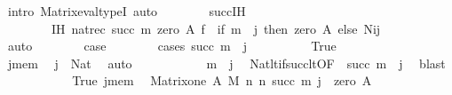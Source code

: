 \begin{isabellebody}
\ {\isacharparenleft}{\kern0pt}intro\ Matrix{\isacharunderscore}{\kern0pt}eval{\isacharunderscore}{\kern0pt}typeI{\isacharparenright}{\kern0pt}\ auto\isanewline
\ \ \ \ \ \ \isamarkupfalse%
\ succ{\isachardot}{\kern0pt}IH\ \isamarkupfalse%
\isanewline
\ \ \ \ \ \ \ \ IH{\isacharcolon}{\kern0pt}\ {\isachardoublequoteopen}nat{\isacharunderscore}{\kern0pt}rec{\isacharprime}{\kern0pt}\ {\isacharparenleft}{\kern0pt}succ\ m{\isacharparenright}{\kern0pt}\ {\isacharparenleft}{\kern0pt}zero\ A{\isacharparenright}{\kern0pt}\ {\isacharquery}{\kern0pt}f\ {\isacharequal}{\kern0pt}\ {\isacharparenleft}{\kern0pt}if\ m\ {\isacharless}{\kern0pt}\ j\ then\ zero\ A\ else\ N{\isacharbackquote}{\kern0pt}i{\isacharbackquote}{\kern0pt}j{\isacharparenright}{\kern0pt}{\isachardoublequoteclose}\isanewline
\ \ \ \ \ \ \ \ \isamarkupfalse%
\ auto\isanewline
\ \ \ \ \ \ \isamarkupfalse%
\ {\isacharquery}{\kern0pt}case\isanewline
\ \ \ \ \ \ \isamarkupfalse%
\ {\isacharparenleft}{\kern0pt}cases\ {\isachardoublequoteopen}succ\ m\ {\isacharless}{\kern0pt}\ j{\isachardoublequoteclose}{\isacharparenright}{\kern0pt}\isanewline
\ \ \ \ \ \ \ \ \isamarkupfalse%
\ True\isanewline
\ \ \ \ \ \ \ \ \isanewline
\ \ \ \ \ \ \ \ \isamarkupfalse%
\ j{\isacharunderscore}{\kern0pt}mem\ \isamarkupfalse%
\ {\isachardoublequoteopen}j\ {\isacharcolon}{\kern0pt}\ Nat{\isachardoublequoteclose}\ \isamarkupfalse%
\ auto\isanewline
\ \ \ \ \ \ \ \ \isamarkupfalse%
\ \isamarkupfalse%
\ {\isachardoublequoteopen}m\ {\isacharless}{\kern0pt}\ j{\isachardoublequoteclose}\ \isamarkupfalse%
\ Nat{\isacharunderscore}{\kern0pt}lt{\isacharunderscore}{\kern0pt}if{\isacharunderscore}{\kern0pt}succ{\isacharunderscore}{\kern0pt}lt{\isacharbrackleft}{\kern0pt}OF\ {\isacharunderscore}{\kern0pt}\ {\isacartoucheopen}succ\ m\ {\isacharless}{\kern0pt}\ j{\isacartoucheclose}{\isacharbrackright}{\kern0pt}\ \isamarkupfalse%
\ blast\isanewline
\ \ \ \ \ \ \ \ \isamarkupfalse%
\ \isamarkupfalse%
\ True\ j{\isacharunderscore}{\kern0pt}mem\ \isamarkupfalse%
\ {\isachardoublequoteopen}Matrix{\isacharunderscore}{\kern0pt}one\ A\ M\ n\ n\ {\isacharbackquote}{\kern0pt}{\isacharparenleft}{\kern0pt}succ\ m{\isacharparenright}{\kern0pt}\ {\isacharbackquote}{\kern0pt}j\ {\isacharequal}{\kern0pt}\ zero\ A{\isachardoublequoteclose}\isanewline
\ \ \ \ \ \ \ \ \ \ \isamarkupfalse%

\end{isabellebody}
